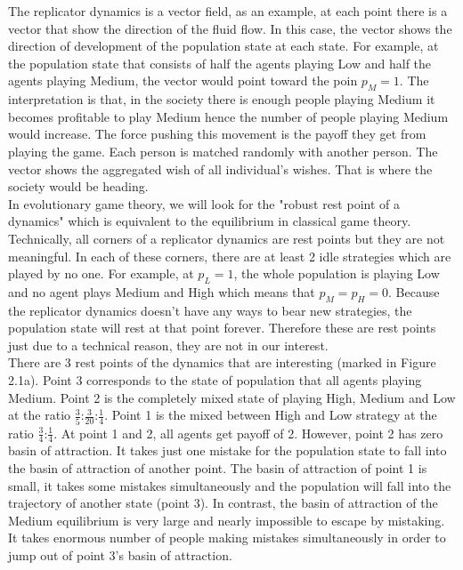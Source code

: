 \documentclass[12.5pt]{report}
\begin{document}
The replicator dynamics is a vector field, as an example, at each point there is a vector that show the direction of the fluid flow. In this case, the vector shows the direction of development of the population state at each state. For example, at the population state that consists of half the agents playing Low and half the agents playing Medium, the vector would point toward the poin $p_M = 1$. The interpretation is that, in the society there is enough people playing Medium it becomes profitable to play Medium hence the number of people playing Medium would increase. The force pushing this movement is the payoff they get from playing the game. Each person is matched randomly with another person. The vector shows the aggregated wish of all individual's wishes. That is where the society would be heading.\\

In evolutionary game theory, we will look for the "robust rest point of a dynamics" \cite{vega} which is equivalent to the equilibrium in classical game theory. Technically, all corners of a replicator dynamics are rest points but they are not meaningful. In each of these corners, there are at least 2 idle strategies which are played by no one. For example, at $p_L=1$, the whole population is playing Low and no agent plays Medium and High which means that $p_M=p_H=0$. Because the replicator dynamics doesn't have any ways to bear new strategies, the population state will rest at that point forever. Therefore these are rest points just due to a technical reason, they are not in our interest.\\

There are 3 rest points of the dynamics that are interesting (marked in Figure 2.1a). Point 3 corresponds to the state of population that all agents playing Medium. Point 2 is the completely mixed state of playing High, Medium and Low at the ratio $\frac{3}{5}$:$\frac{3}{20}$:$\frac{1}{4}$. Point 1 is the mixed between High and Low strategy at the ratio $\frac{3}{4}$:$\frac{1}{4}$. At point 1 and 2, all agents get payoff of 2. 
However, point 2 has zero basin of attraction. It takes just one mistake for the population state to fall into the basin of attraction of another point. The basin of attraction of point 1 is small, it takes some mistakes simultaneously and the population will fall into the trajectory of another state (point 3). In contrast, the basin of attraction of the Medium equilibrium is very large and nearly impossible to escape by mistaking. It takes enormous number of people making mistakes simultaneously in order to jump out of point 3's basin of attraction. \\
\end{document}
